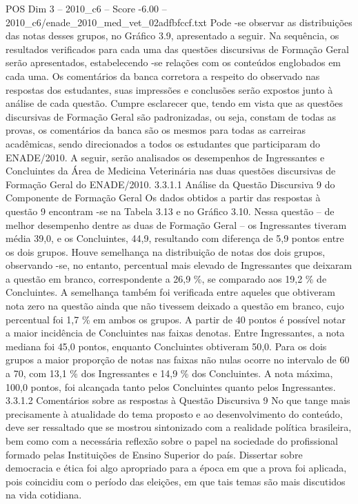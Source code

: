 \begin{textsample}{POS Dim 3 – 2010\_c6 – Score -6.00 – 2010\_c6/enade\_2010\_med\_vet\_02adfbfccf.txt}
Pode -se observar as distribuições das notas desses grupos, no Gráfico 3.9, apresentado a seguir.
Na sequência, os resultados verificados para cada uma das questões discursivas de Formação Geral serão apresentados, estabelecendo -se relações com os conteúdos englobados em cada uma.
Os comentários da banca corretora a respeito do observado nas respostas dos estudantes, suas impressões e conclusões serão expostos junto à análise de cada questão.
Cumpre esclarecer que, tendo em vista que as questões discursivas de Formação Geral são padronizadas, ou seja, constam de todas as provas, os comentários da banca são os mesmos para todas as carreiras acadêmicas, sendo direcionados a todos os estudantes que participaram do ENADE/2010.
A seguir, serão analisados os desempenhos de Ingressantes e Concluintes da Área de Medicina Veterinária nas duas questões discursivas de Formação Geral do ENADE/2010. 3.3.1.1 Análise da Questão Discursiva 9 do Componente de Formação Geral Os dados obtidos a partir das respostas à questão 9 encontram -se na Tabela 3.13 e no Gráfico 3.10.
Nessa questão – de melhor desempenho dentre as duas de Formação Geral – os Ingressantes tiveram média 39,0, e os Concluintes, 44,9, resultando com diferença de 5,9 pontos entre os dois grupos.
Houve semelhança na distribuição de notas dos dois grupos, observando -se, no entanto, percentual mais elevado de Ingressantes que deixaram a questão em branco, correspondente a 26,9 \%, se comparado aos 19,2 \% de Concluintes.
A semelhança também foi verificada entre aqueles que obtiveram nota zero na questão ainda que não tivessem deixado a questão em branco, cujo percentual foi 1,7 \% em ambos os grupos.
A partir de 40 pontos é possível notar a maior incidência de Concluintes nas faixas denotas.
Entre Ingressantes, a nota mediana foi 45,0 pontos, enquanto Concluintes obtiveram 50,0.
Para os dois grupos a maior proporção de notas nas faixas não nulas ocorre no intervalo de 60 a 70, com 13,1 \% dos Ingressantes e 14,9 \% dos Concluintes.
A nota máxima, 100,0 pontos, foi alcançada tanto pelos Concluintes quanto pelos Ingressantes. 3.3.1.2 Comentários sobre as respostas à Questão Discursiva 9 No que tange mais precisamente à atualidade do tema proposto e ao desenvolvimento do conteúdo, deve ser ressaltado que se mostrou sintonizado com a realidade política brasileira, bem como com a necessária reflexão sobre o papel na sociedade do profissional formado pelas Instituições de Ensino Superior do país.
Dissertar sobre democracia e ética foi algo apropriado para a época em que a prova foi aplicada, pois coincidiu com o período das eleições, em que tais temas são mais discutidos na vida cotidiana.

\end{textsample}
